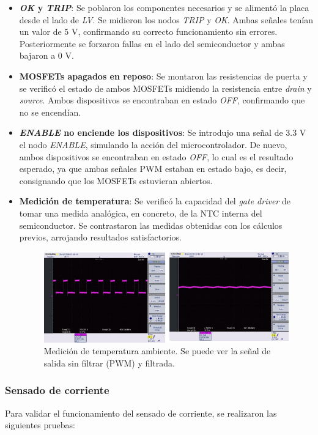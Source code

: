 \begin{itemize}
	\item \textbf{\textit{OK} y \textit{TRIP}}: Se poblaron los componentes necesarios y se alimentó la placa desde el lado de \textit{LV}. Se midieron los nodos \textit{TRIP} y \textit{OK}. Ambas señales tenían un valor de 5 V, confirmando su correcto funcionamiento sin errores. Posteriormente se forzaron fallas en el lado del semiconductor y ambas bajaron a 0 V.
	\item \textbf{MOSFETs apagados en reposo}: Se montaron las resistencias de puerta y se verificó el estado de ambos MOSFETs midiendo la resistencia entre \textit{drain} y \textit{source}. Ambos dispositivos se encontraban en estado \textit{OFF}, confirmando que no se encendían.
	\item \textbf{\textit{ENABLE} no enciende los dispositivos}: Se introdujo una señal de 3.3 V el nodo \textit{ENABLE}, simulando la acción del microcontrolador. De nuevo, ambos dispositivos se encontraban en estado \textit{OFF}, lo cual es el resultado esperado, ya que ambas señales PWM estaban en estado bajo, es decir, consignando que los MOSFETs estuvieran abiertos.
	\item \textbf{Medición de temperatura}: Se verificó la capacidad del \textit{gate driver} de tomar una medida analógica, en concreto, de la NTC interna del semiconductor. Se contrastaron las medidas obtenidas con los cálculos previos, arrojando resultados satisfactorios.
	
	\begin{figure}[H]
		\centering
		\includegraphics[width=0.7\linewidth]{fig/NTC-driver}
		\caption{Medición de temperatura ambiente. Se puede ver la señal de salida sin filtrar (PWM) y filtrada.}
	\end{figure}
	
\end{itemize}
	
\subsubsection{Sensado de corriente}

Para validar el funcionamiento del sensado de corriente, se realizaron las siguientes pruebas:

